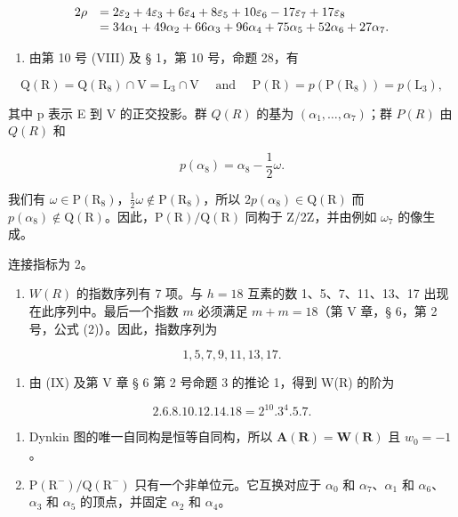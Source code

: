 \[
\begin{array}{r l} 2 \rho & = 2 \varepsilon_ {2} + 4 \varepsilon_ {3} + 6 \varepsilon_ {4} + 8 \varepsilon_ {5} + 10 \varepsilon_ {6} - 17 \varepsilon_ {7} + 17 \varepsilon_ {8} \\ & = 34 \alpha_ {1} + 49 \alpha_ {2} + 66 \alpha_ {3} + 96 \alpha_ {4} + 75 \alpha_ {5} + 52 \alpha_ {6} + 27 \alpha_ {7}. \end{array}
\]

\begin{enumerate}
\def\labelenumi{(\Roman{enumi})}
\setcounter{enumi}{7}
\tightlist
\item
  由第 10 号 (VIII) 及 § 1，第 10 号，命题 28，有
\end{enumerate}

\[
\mathrm{Q} (\mathrm{R}) = \mathrm{Q} (\mathrm{R} _ {8}) \cap \mathrm{V} = \mathrm{L} _ {3} \cap \mathrm{V} \quad \text { and } \quad \mathrm{P} (\mathrm{R}) = p (\mathrm{P} (\mathrm{R} _ {8})) = p (\mathrm{L} _ {3}),
\]

其中 p 表示 E 到 V 的正交投影。群 \(Q(R)\) 的基为 \((\alpha_{1},\ldots,\alpha_{7})\)；群 \(P(R)\) 由 \(Q(R)\) 和

\[
p (\alpha_ {8}) = \alpha_ {8} - \frac {1}{2} \omega .
\]

我们有 \(\omega\in\mathrm{P}(\mathrm{R}_{8})\)，\(\frac{1}{2}\omega\notin\mathrm{P}(\mathrm{R}_{8})\)，所以 \(2p(\alpha_{8})\in\mathrm{Q}(\mathrm{R})\) 而 \(p(\alpha_{8})\notin\mathrm{Q}(\mathrm{R})\)。因此，\(\mathrm{P}(\mathrm{R})/\mathrm{Q}(\mathrm{R})\) 同构于 Z/2Z，并由例如 \(\omega_{7}\) 的像生成。

连接指标为 2。

\begin{enumerate}
\def\labelenumi{(\Roman{enumi})}
\setcounter{enumi}{8}
\tightlist
\item
  \(W(R)\) 的指数序列有 7 项。与 \(h = 18\) 互素的数 1、5、7、11、13、17 出现在此序列中。最后一个指数 \(m\) 必须满足 \(m + m = 18\)（第 V 章，§ 6，第 2 号，公式 (2)）。因此，指数序列为
\end{enumerate}

\[
1, 5, 7, 9, 11, 13, 17.
\]

\begin{enumerate}
\def\labelenumi{(\Alph{enumi})}
\setcounter{enumi}{23}
\tightlist
\item
  由 (IX) 及第 V 章 § 6 第 2 号命题 3 的推论 1，得到 W(R) 的阶为
\end{enumerate}

\[
2. 6. 8. 10. 12. 14. 18 = 2 ^ {10}. 3 ^ {4}. 5. 7.
\]

\begin{enumerate}
\def\labelenumi{(\Roman{enumi})}
\setcounter{enumi}{10}
\item
  Dynkin 图的唯一自同构是恒等自同构，所以 \(\mathbf{A}(\mathbf{R}) = \mathbf{W}(\mathbf{R})\) 且 \(w_0 = -1\)。
\item
  \(\mathrm{P}(\mathrm{R}^{-})/\mathrm{Q}(\mathrm{R}^{-})\) 只有一个非单位元。它互换对应于 \(\alpha_{0}\) 和 \(\alpha_{7}\)、\(\alpha_{1}\) 和 \(\alpha_{6}\)、\(\alpha_{3}\) 和 \(\alpha_{5}\) 的顶点，并固定 \(\alpha_{2}\) 和 \(\alpha_{4}\)。
\end{enumerate}

